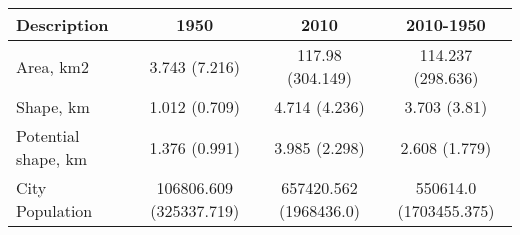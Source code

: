 \begin{tabular}{lccc}
\toprule
Description & 1950 & 2010 & 2010-1950 \\
\midrule
Area, km2 & 3.743 (7.216) & 117.98 (304.149) & 114.237 (298.636) \\
Shape, km & 1.012 (0.709) & 4.714 (4.236) & 3.703 (3.81) \\
Potential shape, km & 1.376 (0.991) & 3.985 (2.298) & 2.608 (1.779) \\
City Population & 106806.609 (325337.719) & 657420.562 (1968436.0) & 550614.0 (1703455.375) \\
\bottomrule
\end{tabular}
